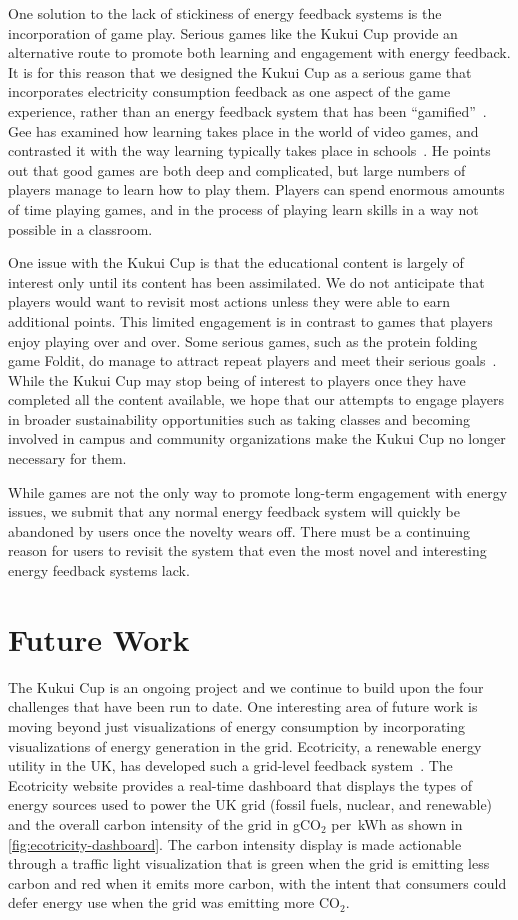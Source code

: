 \documentclass[10pt, conference, compsocconf]{IEEEtran-old}
\newcommand{\COtwo}{CO\ensuremath{_2}\xspace}
\newcommand{\kWh}{\,kWh\xspace}
\begin{document}
One solution to the lack of stickiness of energy feedback systems is the incorporation of game play. Serious games like the Kukui Cup provide an alternative route to promote both learning and engagement with energy feedback. It is for this reason that we designed the Kukui Cup as a serious game that incorporates electricity consumption feedback as one aspect of the game experience, rather than an energy feedback system that has been ``gamified''~\cite{Deterding-2011b}. Gee has examined how learning takes place in the world of video games, and contrasted it with the way learning typically takes place in schools~\cite{Gee2007}. He points out that good games are both deep and complicated, but large numbers of players manage to learn how to play them. Players can spend enormous amounts of time playing games, and in the process of playing learn skills in a way not possible in a classroom.

One issue with the Kukui Cup is that the educational content is largely of interest only until its content has been assimilated. We do not anticipate that players would want to revisit most actions unless they were able to earn additional points. This limited engagement is in contrast to games that players enjoy playing over and over. Some serious games, such as the protein folding game Foldit, do manage to attract repeat players and meet their serious goals~\cite{Khatib2011}. While the Kukui Cup may stop being of interest to players once they have completed all the content available, we hope that our attempts to engage players in broader sustainability opportunities such as taking classes and becoming involved in campus and community organizations make the Kukui Cup no longer necessary for them.

While games are not the only way to promote long-term engagement with energy issues, we submit that any normal energy feedback system will quickly be abandoned by users once the novelty wears off. There must be a continuing reason for users to revisit the system that even the most novel and interesting energy feedback systems lack.


\section{Future Work}

The Kukui Cup is an ongoing project and we continue to build upon the four challenges that have been run to date. One interesting area of future work is moving beyond just visualizations of energy consumption by incorporating visualizations of energy generation in the grid. Ecotricity, a renewable energy utility in the UK, has developed such a grid-level feedback system~\cite{Ecotricity}. The Ecotricity website provides a real-time dashboard that displays the types of energy sources used to power the UK grid (fossil fuels, nuclear, and renewable) and the overall carbon intensity of the grid in g\COtwo per \kWh as shown in \autoref{fig:ecotricity-dashboard}. The carbon intensity display is made actionable through a traffic light visualization that is green when the grid is emitting less carbon and red when it emits more carbon, with the intent that consumers could defer energy use when the grid was emitting more \COtwo.
\end{document}

